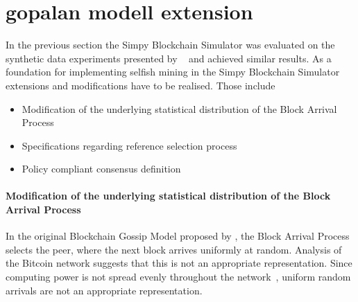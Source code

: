 

\section{gopalan modell extension}
In the previous section the Simpy Blockchain Simulator was evaluated on the synthetic data experiments presented by \gopalan~ and achieved similar results.
As a foundation for implementing selfish mining in the Simpy Blockchain Simulator extensions and modifications have to be realised. Those include
\begin{itemize}
\item Modification of the underlying statistical distribution of the Block Arrival Process
\item Specifications regarding reference selection process
\item Policy compliant consensus definition
\end{itemize}
\paragraph{Modification of the underlying statistical distribution of the Block Arrival Process}
In the original Blockchain Gossip Model proposed by \gopalan, the Block Arrival Process selects the peer, where the next block arrives uniformly at random. Analysis of the Bitcoin network suggests that this is not an appropriate representation. Since computing power is not spread evenly throughout the network~\cite{wang2019measurement}, uniform random arrivals are not an appropriate representation. 
